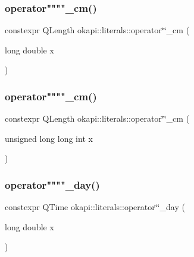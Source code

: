 \mbox{\label{namespaceokapi_1_1literals_ad8a0c1bc6292d7bab8ead5d70663c34f}} 
\subsubsection{\texorpdfstring{operator""""\_cm()}{operator""\_cm()}\hspace{0.1cm}{\footnotesize\ttfamily [1/2]}}
{\footnotesize\ttfamily constexpr Q\+Length okapi\+::literals\+::operator\char`\"{}\char`\"{}\+\_\+cm (\begin{DoxyParamCaption}\item[{long double}]{x }\end{DoxyParamCaption})}

\mbox{\label{namespaceokapi_1_1literals_aee248e89ed1fd0ae224a80eaac04be72}} 
\subsubsection{\texorpdfstring{operator""""\_cm()}{operator""\_cm()}\hspace{0.1cm}{\footnotesize\ttfamily [2/2]}}
{\footnotesize\ttfamily constexpr Q\+Length okapi\+::literals\+::operator\char`\"{}\char`\"{}\+\_\+cm (\begin{DoxyParamCaption}\item[{unsigned long long int}]{x }\end{DoxyParamCaption})}

\mbox{\label{namespaceokapi_1_1literals_a399e9f29b15b5e34ea3577f011a3ca28}} 
\subsubsection{\texorpdfstring{operator""""\_day()}{operator""\_day()}\hspace{0.1cm}{\footnotesize\ttfamily [1/2]}}
{\footnotesize\ttfamily constexpr Q\+Time okapi\+::literals\+::operator\char`\"{}\char`\"{}\+\_\+day (\begin{DoxyParamCaption}\item[{long double}]{x }\end{DoxyParamCaption})}

